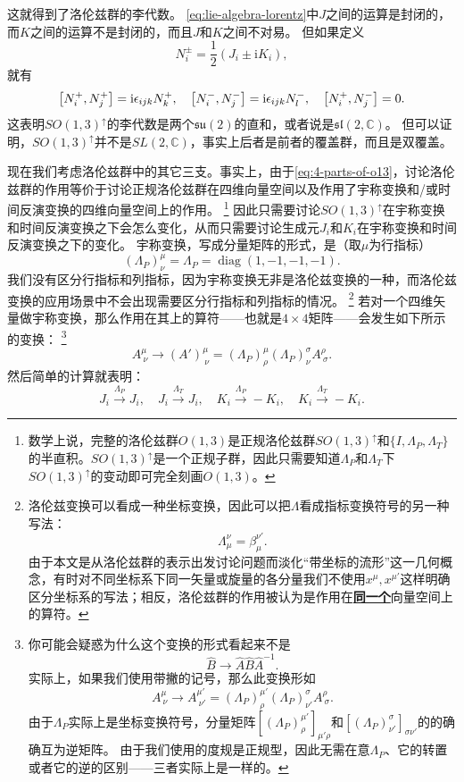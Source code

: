 \documentclass[hyperref, UTF8, a4paper]{ctexart}
\DeclareMathOperator{\diag}{diag}
\newcommand*{\ii}{\mathrm{i}}
\newcommand*{\complexes}{\mathbb{C}}
\newcommand{\concept}[1]{\underline{\textbf{#1}}}
\begin{document}
这就得到了洛伦兹群的李代数。
\eqref{eq:lie-algebra-lorentz}中$J$之间的运算是封闭的，而$K$之间的运算不是封闭的，而且$J$和$K$之间不对易。
但如果定义
\begin{equation}
    N_i^\pm = \frac{1}{2} (J_i \pm \ii K_i),
    \label{eq:def-n-pm}
\end{equation}
就有
\begin{equation}
    \comm{N_i^+}{N_j^+} = \ii \epsilon_{ijk} N_k^+, \quad \comm{N_i^-}{N_j^-} = \ii \epsilon_{ijk} N_l^-, \quad \comm{N^+_i}{N^-_j} = 0.
    \label{eq:two-su2-algebra}
\end{equation}
这表明$SO(1,3)^\uparrow$的李代数是两个$\mathfrak{su}(2)$的直和，或者说是$\mathfrak{sl}(2, \complexes)$。
但可以证明，$SO(1,3)^\uparrow$并不是$SL(2, \complexes)$，事实上后者是前者的覆盖群，而且是双覆盖。

现在我们考虑洛伦兹群中的其它三支。事实上，由于\eqref{eq:4-parts-of-o13}，讨论洛伦兹群的作用等价于讨论正规洛伦兹群在四维向量空间以及作用了宇称变换和/或时间反演变换的四维向量空间上的作用。%
\footnote{数学上说，完整的洛伦兹群$O(1,3)$是正规洛伦兹群$SO(1,3)^\uparrow$和$\{I, \Lambda_P, \Lambda_T\}$的半直积。$SO(1,3)^\uparrow$是一个正规子群，因此只需要知道$\Lambda_P$和$\Lambda_T$下$SO(1,3)^\uparrow$的变动即可完全刻画$O(1,3)$。}%
因此只需要讨论$SO(1,3)^\uparrow$在宇称变换和时间反演变换之下会怎么变化，从而只需要讨论生成元$J_i$和$K_i$在宇称变换和时间反演变换之下的变化。
宇称变换，写成分量矩阵的形式，是（取$\mu$为行指标）
\[
    (\Lambda_P)^\mu_\nu = \Lambda_P = \diag(1, -1, -1, -1).
\]
我们没有区分行指标和列指标，因为宇称变换无非是洛伦兹变换的一种，而洛伦兹变换的应用场景中不会出现需要区分行指标和列指标的情况。%
\footnote{洛伦兹变换可以看成一种坐标变换，因此可以把$\Lambda$看成指标变换符号的另一种写法：
\[
    \Lambda_\mu^\nu = \beta_{\mu}^{\nu'}.
\]
由于本文是从洛伦兹群的表示出发讨论问题而淡化“带坐标的流形”这一几何概念，有时对不同坐标系下同一矢量或旋量的各分量我们不使用$x^\mu, x^{\mu'}$这样明确区分坐标系的写法；相反，洛伦兹群的作用被认为是作用在\concept{同一个}向量空间上的算符。
}%
若对一个四维矢量做宇称变换，那么作用在其上的算符——也就是$4\times 4$矩阵——会发生如下所示的变换：%
\footnote{你可能会疑惑为什么这个变换的形式看起来不是
\[
    \hat{B} \longrightarrow \hat{A} \hat{B} \hat{A}^{-1}.
\]
实际上，如果我们使用带撇的记号，那么此变换形如
\[
    A^\mu_{\ \nu} \longrightarrow A^{\mu'}_{\ \nu'} = (\Lambda_P)^{\mu'}_\rho (\Lambda_P)^\sigma_{\nu'} A^\rho_{\ \sigma}.
\]
由于$\Lambda_P$实际上是坐标变换符号，分量矩阵$[(\Lambda_P)^{\mu'}_\rho]_{\mu' \rho}$和$[(\Lambda_P)^\sigma_{\nu'}]_{\sigma \nu'}$的的确确互为逆矩阵。
由于我们使用的度规是正规型，因此无需在意$\Lambda_P$、它的转置或者它的逆的区别——三者实际上是一样的。
}%
\[
    A^\mu_{\ \nu} \longrightarrow (A')^\mu_{\ \nu} = (\Lambda_P)^\mu_\rho (\Lambda_P)^\sigma_\nu A^\rho_{\ \sigma}.
\]
然后简单的计算就表明：
\begin{equation}
    J_i \stackrel{\Lambda_P}{\longrightarrow} J_i, \quad J_i \stackrel{\Lambda_T}{\longrightarrow} J_i, \quad K_i \stackrel{\Lambda_P}{\longrightarrow} - K_i, \quad K_i \stackrel{\Lambda_T}{\longrightarrow} - K_i.
    \label{eq:parity-and-time-reversion-transform}
\end{equation}
\end{document}
